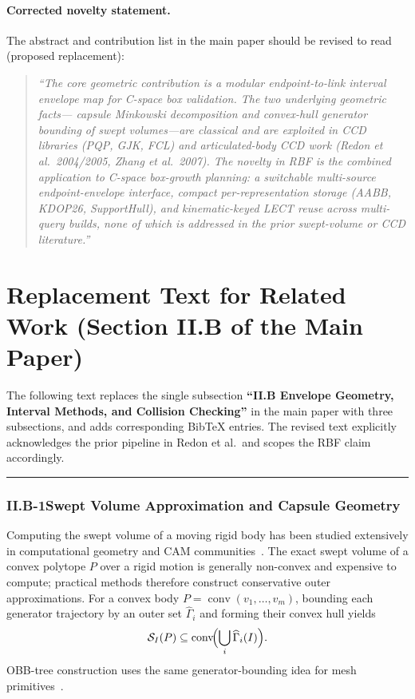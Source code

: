 \documentclass[11pt,a4paper]{article}
\begin{document}
\paragraph{Corrected novelty statement.}
The abstract and contribution list in the main paper should be revised to read
(proposed replacement):
\begin{quote}
  \textit{``The core geometric contribution is a modular endpoint-to-link interval
  envelope map for C-space box validation.  The two underlying geometric facts---
  capsule Minkowski decomposition and convex-hull generator bounding of swept
  volumes---are classical and are exploited in CCD libraries (PQP, GJK, FCL) and
  articulated-body CCD work (Redon et al.\ 2004/2005, Zhang et al.\ 2007).
  The novelty in RBF is the combined application to C-space box-growth planning:
  a switchable multi-source endpoint-envelope interface, compact per-representation
  storage (AABB, KDOP26, SupportHull), and kinematic-keyed LECT reuse across
  multi-query builds, none of which is addressed in the prior swept-volume or CCD
  literature.''}
\end{quote}

\section{Replacement Text for Related Work (Section II.B of the Main Paper)}
\label{sec:replacement_text}

The following text replaces the single subsection
\textbf{``II.B Envelope Geometry, Interval Methods, and Collision Checking''}
in the main paper with three subsections, and adds corresponding BibTeX entries.
The revised text explicitly acknowledges the prior pipeline in Redon et al.\
and scopes the RBF claim accordingly.

\bigskip
\hrule
\bigskip

\subsubsection*{II.B-1\quad Swept Volume Approximation and Capsule Geometry}

Computing the swept volume of a moving rigid body has been studied extensively
in computational geometry and CAM communities~\cite{blackmore1992swept,abdel2004swept}.
The exact swept volume of a convex polytope $P$ over a rigid motion is generally
non-convex and expensive to compute; practical methods therefore construct
conservative outer approximations.  For a convex body
$P = \operatorname{conv}(v_1,\dots,v_m)$, bounding each generator trajectory
by an outer set $\widehat{\Gamma}_i$ and forming their convex hull yields
\[
  \mathcal{S}_I(P) \subseteq \operatorname{conv}\!\Bigl(\bigcup_i \widehat{\Gamma}_i(I)\Bigr).
\]
OBB-tree construction uses the same generator-bounding idea for mesh
primitives~\cite{gottschalk1996obbtree}.
\end{document}
